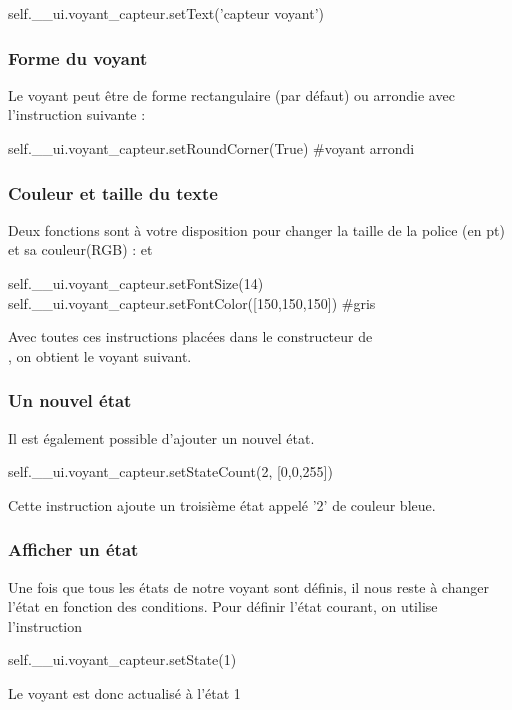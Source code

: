 \begin{pyCode}
self.__ui.voyant_capteur.setText('capteur voyant')
\end{pyCode}


\subsubsection{Forme du voyant}

Le voyant peut être de forme rectangulaire (par défaut) ou arrondie avec l'instruction suivante :

\begin{pyCode}
self.__ui.voyant_capteur.setRoundCorner(True) #voyant arrondi
\end{pyCode}

\subsubsection{Couleur et taille du texte}

Deux fonctions sont à votre disposition pour changer la taille de la police (en pt) et sa couleur(RGB) :  et 
\begin{pyCode}
self.__ui.voyant_capteur.setFontSize(14)
self.__ui.voyant_capteur.setFontColor([150,150,150]) #gris
\end{pyCode}

Avec toutes ces instructions placées dans le constructeur de \\ , on obtient le voyant suivant.


\subsubsection{Un nouvel état}
Il est également possible d'ajouter un nouvel état.
\begin{pyCode}
self.__ui.voyant_capteur.setStateCount(2, [0,0,255]) 
\end{pyCode}
Cette instruction ajoute un troisième état appelé '2' de couleur bleue.

\subsubsection{Afficher un état}

Une fois que tous les états de notre voyant sont définis, il nous reste à changer l'état en fonction des conditions.
Pour définir l'état courant, on utilise l'instruction 
\begin{pyCode}
self.__ui.voyant_capteur.setState(1) 
\end{pyCode}
Le voyant est donc actualisé à l'état 1


